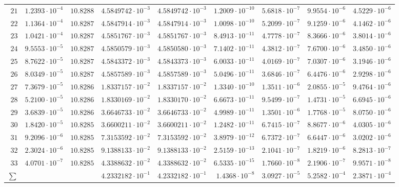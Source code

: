{\begin{longtable}{@{}rrrrrrrrr@{}}
$21$ & $1.2393\cdot10^{-4}$ & $10.8288$ & $4.5849742\cdot10^{-3}$ & $4.5849742\cdot10^{-3}$ & $1.2009\cdot10^{-10}$ & $5.6818\cdot10^{-7}$ & $9.9554\cdot10^{-6}$ & $4.5229\cdot10^{-6}$\\
$22$ & $1.1364\cdot10^{-4}$ & $10.8287$ & $4.5847914\cdot10^{-3}$ & $4.5847914\cdot10^{-3}$ & $1.0098\cdot10^{-10}$ & $5.2099\cdot10^{-7}$ & $9.1259\cdot10^{-6}$ & $4.1462\cdot10^{-6}$\\
$23$ & $1.0421\cdot10^{-4}$ & $10.8287$ & $4.5851767\cdot10^{-3}$ & $4.5851767\cdot10^{-3}$ & $8.4913\cdot10^{-11}$ & $4.7778\cdot10^{-7}$ & $8.3666\cdot10^{-6}$ & $3.8014\cdot10^{-6}$\\
$24$ & $9.5553\cdot10^{-5}$ & $10.8287$ & $4.5850579\cdot10^{-3}$ & $4.5850580\cdot10^{-3}$ & $7.1402\cdot10^{-11}$ & $4.3812\cdot10^{-7}$ & $7.6700\cdot10^{-6}$ & $3.4850\cdot10^{-6}$\\
$25$ & $8.7622\cdot10^{-5}$ & $10.8287$ & $4.5843372\cdot10^{-3}$ & $4.5843373\cdot10^{-3}$ & $6.0033\cdot10^{-11}$ & $4.0169\cdot10^{-7}$ & $7.0307\cdot10^{-6}$ & $3.1946\cdot10^{-6}$\\
$26$ & $8.0349\cdot10^{-5}$ & $10.8287$ & $4.5857589\cdot10^{-3}$ & $4.5857589\cdot10^{-3}$ & $5.0496\cdot10^{-11}$ & $3.6846\cdot10^{-7}$ & $6.4476\cdot10^{-6}$ & $2.9298\cdot10^{-6}$\\
$27$ & $7.3679\cdot10^{-5}$ & $10.8286$ & $1.8337157\cdot10^{-2}$ & $1.8337157\cdot10^{-2}$ & $1.3340\cdot10^{-10}$ & $1.3511\cdot10^{-6}$ & $2.0855\cdot10^{-5}$ & $9.4764\cdot10^{-6}$\\
$28$ & $5.2100\cdot10^{-5}$ & $10.8286$ & $1.8330169\cdot10^{-2}$ & $1.8330170\cdot10^{-2}$ & $6.6673\cdot10^{-11}$ & $9.5499\cdot10^{-7}$ & $1.4731\cdot10^{-5}$ & $6.6945\cdot10^{-6}$\\
$29$ & $3.6839\cdot10^{-5}$ & $10.8286$ & $3.6646733\cdot10^{-2}$ & $3.6646733\cdot10^{-2}$ & $4.9989\cdot10^{-11}$ & $1.3501\cdot10^{-6}$ & $1.7768\cdot10^{-5}$ & $8.0750\cdot10^{-6}$\\
$30$ & $1.8420\cdot10^{-5}$ & $10.8285$ & $3.6600211\cdot10^{-2}$ & $3.6600211\cdot10^{-2}$ & $1.2482\cdot10^{-11}$ & $6.7415\cdot10^{-7}$ & $8.8677\cdot10^{-6}$ & $4.0305\cdot10^{-6}$\\
$31$ & $9.2096\cdot10^{-6}$ & $10.8285$ & $7.3153592\cdot10^{-2}$ & $7.3153592\cdot10^{-2}$ & $3.8979\cdot10^{-12}$ & $6.7372\cdot10^{-7}$ & $6.6447\cdot10^{-6}$ & $3.0202\cdot10^{-6}$\\
$32$ & $2.3024\cdot10^{-6}$ & $10.8285$ & $9.1388133\cdot10^{-2}$ & $9.1388133\cdot10^{-2}$ & $2.5159\cdot10^{-13}$ & $2.1041\cdot10^{-7}$ & $1.8219\cdot10^{-6}$ & $8.2813\cdot10^{-7}$\\
$33$ & $4.0701\cdot10^{-7}$ & $10.8285$ & $4.3388632\cdot10^{-2}$ & $4.3388632\cdot10^{-2}$ & $6.5335\cdot10^{-15}$ & $1.7660\cdot10^{-8}$ & $2.1906\cdot10^{-7}$ & $9.9571\cdot10^{-8}$\\
\midrule
$\sum$ &  &  & $4.2332182\cdot10^{-1}$ & $4.2332182\cdot10^{-1}$ & $1.4368\cdot10^{-8}$ & $3.0927\cdot10^{-5}$ & $5.2582\cdot10^{-4}$ & $2.3871\cdot10^{-4}$\\
\end{longtable}
}


